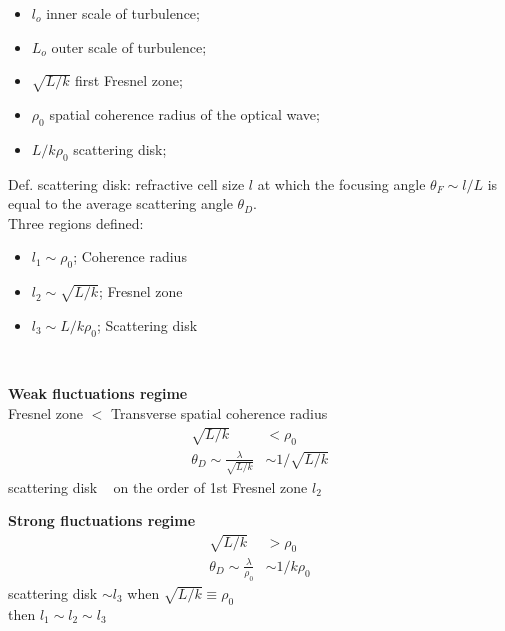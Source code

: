 \documentclass[a4paper]{article}
\begin{document}
\begin{minipage}[b]{0.5\textwidth}
\begin{itemize}
\item $l_o$ inner scale of turbulence;
\item $L_o$ outer scale of turbulence;
\item $\sqrt{L/k}$ first Fresnel zone;
\item $\rho_0$ spatial coherence radius of the optical wave;
\item $L/k\rho_0$ scattering disk;
\end{itemize}
\end{minipage}
\begin{minipage}[c]{0.5\textwidth}
Def. scattering disk: refractive cell size $l$ at which the focusing angle $\theta_F\sim l/L$ is equal to the average scattering angle $\theta_D$.\\

Three regions defined:
\begin{itemize}
\item $l_1\sim\rho_0$; Coherence radius 
\item $l_2\sim\sqrt{L/k}$; Fresnel zone
\item $l_3\sim L/k\rho_0$; Scattering disk
\end{itemize}
\end{minipage}
\\

\fbox
{
\begin{minipage}{0.5\textwidth}
\textbf{Weak fluctuations regime}\\
Fresnel zone $<$ Transverse spatial coherence radius\\
\begin{align*}
\sqrt{L/k} &< \rho_0\\
\theta_D \sim \frac{\lambda}{\sqrt{L/k}}&\sim 1/\sqrt{L/k}
\end{align*}
scattering disk ~ on the order of 1st Fresnel zone $l_2$
\end{minipage}
}
\fbox
{
\begin{minipage}{0.5\textwidth}
\textbf{Strong fluctuations regime}\\
\begin{align*}
\sqrt{L/k} &> \rho_0\\
\theta_D \sim \frac{\lambda}{\rho_0}&\sim 1/k\rho_0
\end{align*}
scattering disk $\sim l_3$ when $\sqrt{L/k}\equiv \rho_0$\\
then $l_1\sim l_2\sim l_3$
\end{minipage}
}
\end{document}
